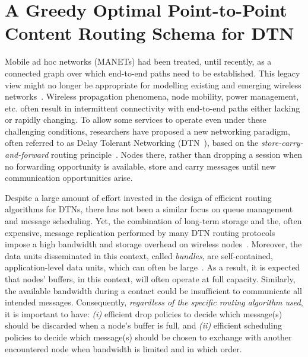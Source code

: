 \chapter{A Greedy Optimal Point-to-Point Content Routing Schema for DTN}
\label{chapter:ptp}
\minitoc

Mobile ad hoc networks (MANETs) had been treated, until recently, as a connected graph over which
end-to-end paths need to be established. This legacy view might no longer be appropriate for modelling existing and emerging wireless networks~\cite{Fall:DTNrouting,Fall:Sigcomm05,Glance:pollen}. Wireless propagation phenomena, node mobility, power management, etc. often result in intermittent connectivity with end-to-end paths either lacking or rapidly changing. To allow some services to operate even under these challenging conditions, researchers have proposed a new networking paradigm, often referred to as Delay Tolerant Networking (DTN~\cite{dtnrg}), based on the \emph{store-carry-and-forward} routing principle~\cite{Fall:DTNrouting}. Nodes there, rather than dropping a session when no forwarding opportunity is available, store and carry messages until new communication opportunities arise.

Despite a large amount of effort invested in the design of efficient routing algorithms for DTNs, there has not been a similar focus on queue management and message scheduling. Yet, the combination of long-term storage and the, often expensive, message replication performed by many DTN routing protocols~\cite{Vahdat:epidemic,Lindgren:probabilistic} impose a high bandwidth and storage overhead on wireless
nodes~\cite{akis:ton-multi}. Moreover, the data units disseminated in this context, called \emph{bundles}, are self-contained, application-level data units, which can often be large~\cite{dtnrg}. As a result, it is expected that nodes' buffers, in this context, will often operate at full capacity. Similarly, the available bandwidth during a contact could be insufficient to communicate all intended messages. Consequently, \emph{regardless of the specific routing algorithm used}, it is important to have: \emph{(i)} efficient drop policies to decide which message(s) should be discarded when a node's buffer is full, and \emph{(ii)} efficient scheduling policies to decide which message(s) should be chosen to exchange with another encountered node when bandwidth is limited and in which order.


